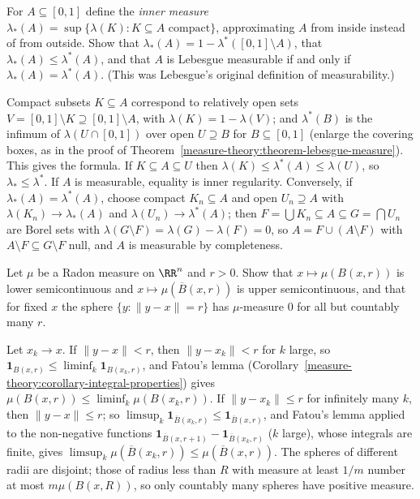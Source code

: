 \begin{exercise}\label{measure-theory:exercise-inner-measure}
For $A \subseteq [0, 1]$ define the \emph{inner measure} $\lambda_*(A) = \sup\{\lambda(K) : K \subseteq A \text{ compact}\}$, approximating $A$ from inside instead of from outside. Show that
$\lambda_*(A) = 1 - \lambda^*([0, 1] \setminus A)$, that $\lambda_*(A) \leq \lambda^*(A)$, and that $A$ is Lebesgue measurable if and only if $\lambda_*(A) = \lambda^*(A)$. (This was Lebesgue's original
definition of measurability.)
\end{exercise}

\begin{solution}
Compact subsets $K \subseteq A$ correspond to relatively open sets $V = [0, 1] \setminus K \supseteq [0, 1] \setminus A$, with $\lambda(K) = 1 - \lambda(V)$; and $\lambda^*(B)$ is the infimum of $\lambda(U \cap [0, 1])$
over open $U \supseteq B$ for $B \subseteq [0, 1]$ (enlarge the covering boxes, as in the proof of Theorem~\ref{measure-theory:theorem-lebesgue-measure}). This gives the formula. If $K \subseteq A \subseteq U$
then $\lambda(K) \leq \lambda^*(A) \leq \lambda(U)$, so $\lambda_* \leq \lambda^*$. If $A$ is measurable, equality is inner regularity. Conversely, if $\lambda_*(A) = \lambda^*(A)$, choose compact $K_n \subseteq A$
and open $U_n \supseteq A$ with $\lambda(K_n) \to \lambda_*(A)$ and $\lambda(U_n) \to \lambda^*(A)$; then $F = \bigcup K_n \subseteq A \subseteq G = \bigcap U_n$ are Borel sets with
$\lambda(G \setminus F) = \lambda(G) - \lambda(F) = 0$, so $A = F \cup (A \setminus F)$ with $A \setminus F \subseteq G \setminus F$ null, and $A$ is measurable by completeness.
\end{solution}

\begin{exercise}\label{measure-theory:exercise-ball-semicontinuous}
Let $\mu$ be a Radon measure on $\RR^n$ and $r > 0$. Show that $x \mapsto \mu(B(x, r))$ is lower semicontinuous and $x \mapsto \mu(\overline{B}(x, r))$ is upper semicontinuous, and that for fixed $x$ the
sphere $\{y : \|y - x\| = r\}$ has $\mu$-measure $0$ for all but countably many $r$.
\end{exercise}

\begin{solution}
Let $x_k \to x$. If $\|y - x\| < r$, then $\|y - x_k\| < r$ for $k$ large, so $\mathbf{1}_{B(x, r)} \leq \liminf_k\mathbf{1}_{B(x_k, r)}$, and Fatou's lemma
(Corollary~\ref{measure-theory:corollary-integral-properties}) gives $\mu(B(x, r)) \leq \liminf_k\mu(B(x_k, r))$. If $\|y - x_k\| \leq r$ for infinitely many $k$, then $\|y - x\| \leq r$; so
$\limsup_k\mathbf{1}_{\overline{B}(x_k, r)} \leq \mathbf{1}_{\overline{B}(x, r)}$, and Fatou's lemma applied to the non-negative functions $\mathbf{1}_{\overline{B}(x, r + 1)} - \mathbf{1}_{\overline{B}(x_k, r)}$
($k$ large), whose integrals are finite, gives $\limsup_k\mu(\overline{B}(x_k, r)) \leq \mu(\overline{B}(x, r))$. The spheres of different radii are disjoint; those of radius less than $R$ with measure at
least $1/m$ number at most $m\mu(B(x, R))$, so only countably many spheres have positive measure.
\end{solution}

